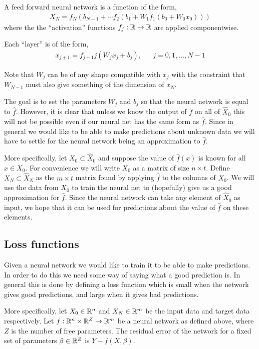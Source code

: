 \documentclass[10pt]{article}
\begin{document}
A feed forward neural network is a function of the form,
\begin{align}
    X_N = f_N(b_{N-1}+\cdots f_2(b_1+ W_1f_1(b_0 + W_0x_0))) \label{NN}
\end{align}
where the the ``activation'' functions \( f_j:\mathbb{R}\to\mathbb{R} \) are applied componentwise.

Each ``layer'' is of the form,
\begin{align*}
    x_{j+1} = f_{j+1}j(W_j x_{j} + b_j), && j=0,1,\ldots, N-1
\end{align*}

Note that \( W_j \) can be of any shape compatible with \( x_j \) with the constraint that \( W_{N-1} \) must also give something of the dimension of \( x_N \).

The goal is to set the parameters \( W_j \) and \( b_j \) so that the neural network is equal to \( \hat{f} \). However, it is clear that unless we know the output of \( f \) on all of \( \hat{X}_0 \) this will not be possible even if our neural net has the same form as \( \hat{f} \). Since in general we would like to be able to make predictions about unknown data we will have to settle for the neural network being an approximation to \( \hat{f} \).

More specifically, let \( X_0\subset \hat{X}_0 \) and suppose the value of \( \hat{f}(x) \) is known for all \( x\in X_0 \). For convenience we will write \( X_0 \) as a matrix of size \( n\times t \). Define \( X_N\subset \hat{X}_N \) as the \( m\times t \) matrix found by applying \( \hat{f} \) to the columns of \( X_0 \). We will use the data from \( X_0 \) to train the neural net to (hopefully) give us a good approximation for \( \hat{f} \). Since the neural network can take any element of \( \hat{X}_0 \) as input, we hope that it can be used for predictions about the value of \( \hat{f} \) on these elements.


\subsection{Loss functions}
Given a neural network we would like to train it to be able to make predictions. In order to do this we need some way of saying what a good prediction is. In general this is done by defining a loss function which is small when the network gives good predictions, and large when it gives bad predictions.

More specifically, let \( X_0\in\mathbb{R}^{n} \) and \( X_N\in\mathbb{R}^{m} \) be the input data and target data respectively. Let \( f:\mathbb{R}^{n}\times\mathbb{R}^{Z}\to\mathbb{R}^{m} \) be a neural network as defined above, where \( Z \) is the number of free parameters. The residual error of the network for a fixed set of parameters \( \beta\in\mathbb{R}^{Z} \) is \( Y - f(X,\beta) \).
\end{document}
